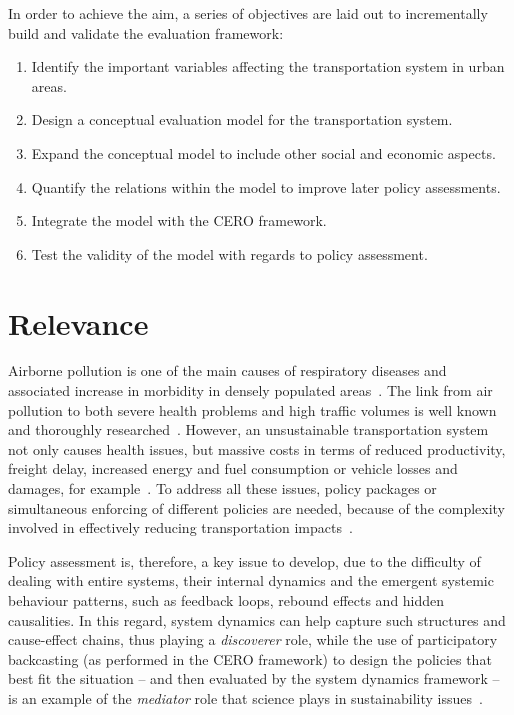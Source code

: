 In order to achieve the aim, a series of objectives are laid out to incrementally build and validate the evaluation framework:
%
\begin{enumerate}[label=(\alph*)]
	\item Identify the important variables affecting the transportation system in urban areas.
	\item Design a conceptual evaluation model for the transportation system.
	\item Expand the conceptual model to include other social and economic aspects.
	\item Quantify the relations within the model to improve later policy assessments.
	\item Integrate the model with the CERO framework.
	\item Test the validity of the model with regards to policy assessment.
\end{enumerate}

\section{Relevance}
\label{s:relevance}
Airborne pollution is one of the main causes of respiratory diseases and associated increase in morbidity in densely populated areas~\parencite{vimercati2011airpollutionmorbidity,who2006air}. The link from air pollution to both severe health problems and high traffic volumes is well known and thoroughly researched~\parencite{who2006air}. However, an unsustainable transportation system not only causes health issues, but massive costs in terms of reduced productivity, freight delay, increased energy and fuel consumption or vehicle losses and damages, for example~\parencite{lizeng2012costcongestion}. To address all these issues, policy packages or simultaneous enforcing of different policies are needed, because of the complexity involved in effectively reducing transportation impacts~\parencite[ch. 3, p. 45]{garcia2014travel}.

Policy assessment is, therefore, a key issue to develop, due to the difficulty of dealing with entire systems, their internal dynamics and the emergent systemic behaviour patterns, such as feedback loops, rebound effects and hidden causalities. In this regard, system dynamics can help capture such structures and cause-effect chains, thus playing a \textit{discoverer} role, while the use of participatory backcasting (as performed in the CERO framework) to design the policies that best fit the situation -- and then evaluated by the system dynamics framework -- is an example of the \textit{mediator} role that science plays in sustainability issues~\parencite{ozawa1996science}.

